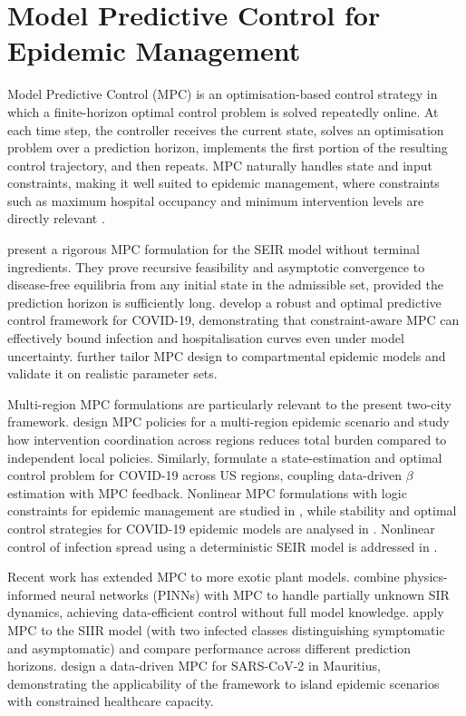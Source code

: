 \section{Model Predictive Control for Epidemic Management}
\label{sec:mpc}

Model Predictive Control (MPC) is an optimisation-based control strategy in which a finite-horizon optimal control problem is solved repeatedly online.
At each time step, the controller receives the current state, solves an optimisation problem over a prediction horizon, implements the first portion of the resulting control trajectory, and then repeats.
MPC naturally handles state and input constraints, making it well suited to epidemic management, where constraints such as maximum hospital occupancy and minimum intervention levels are directly relevant \citep{stoustrup2023,grune2017}.

\citet{esterhuizen2024} present a rigorous MPC formulation for the SEIR model without terminal ingredients.
They prove recursive feasibility and asymptotic convergence to disease-free equilibria from any initial state in the admissible set, provided the prediction horizon is sufficiently long.
\citet{kohler2021} develop a robust and optimal predictive control framework for COVID-19, demonstrating that constraint-aware MPC can effectively bound infection and hospitalisation curves even under model uncertainty.
\citet{sauerteig2022} further tailor MPC design to compartmental epidemic models and validate it on realistic parameter sets.

Multi-region MPC formulations are particularly relevant to the present two-city framework.
\citet{carli2020} design MPC policies for a multi-region epidemic scenario and study how intervention coordination across regions reduces total burden compared to independent local policies.
Similarly, \citet{tsay2021} formulate a state-estimation and optimal control problem for COVID-19 across US regions, coupling data-driven $\beta$ estimation with MPC feedback.
Nonlinear MPC formulations with logic constraints for epidemic management are studied in \citet{morato2020}, while stability and optimal control strategies for COVID-19 epidemic models are analysed in \citet{liu2021}.
Nonlinear control of infection spread using a deterministic SEIR model is addressed in \citet{sharifi2021}.

Recent work has extended MPC to more exotic plant models.
\citet{zhong2025} combine physics-informed neural networks (PINNs) with MPC to handle partially unknown SIR dynamics, achieving data-efficient control without full model knowledge.
\citet{kosyanov2023} apply MPC to the SIIR model (with two infected classes distinguishing symptomatic and asymptomatic) and compare performance across different prediction horizons.
\citet{sayedhassen2025} design a data-driven MPC for SARS-CoV-2 in Mauritius, demonstrating the applicability of the framework to island epidemic scenarios with constrained healthcare capacity.

